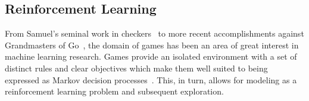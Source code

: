 

\subsection{Reinforcement Learning}

From Samuel's seminal work in checkers~\cite{samuel_checkers}
to more recent accomplishments against Grandmasters of
Go~\cite{deepmind_alphago},
the domain of games has been an area of great interest in machine learning
research.
%
Games provide an isolated environment with a set of distinct rules and clear
objectives which make them well suited to being expressed as Markov decision
processes~\cite{samuel_checkers}.
%
This, in turn, allows for modeling as a reinforcement learning problem and
subsequent exploration.






